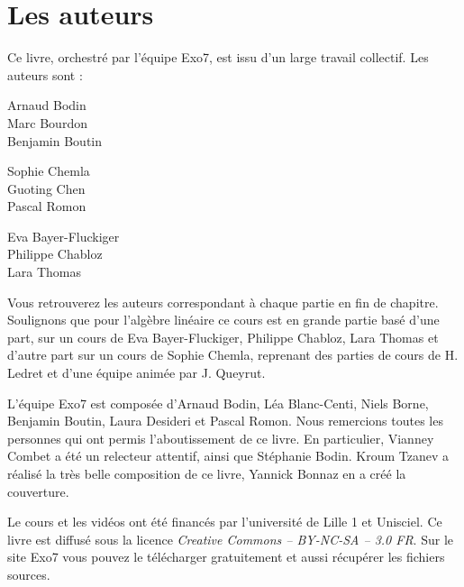 
\clearemptydoublepage
\pagestyle{empty}\thispagestyle{empty}

\vspace*{\fill}

\section*{Les auteurs}

Ce livre, orchestré par l'équipe Exo7, est issu d'un large travail collectif.
Les auteurs sont :

\begin{center}
{
\setlength{\columnseprule}{0pt}
\begin{multicols}{3}
Arnaud Bodin\\
Marc Bourdon\\
Benjamin Boutin


Sophie Chemla\\
Guoting Chen\\
Pascal Romon

Eva Bayer-Fluckiger\\
Philippe Chabloz\\
Lara Thomas
\end{multicols}
}
\end{center}

Vous retrouverez les auteurs correspondant à chaque partie en fin de chapitre.
Soulignons que pour l'algèbre linéaire ce cours est en grande partie basé
d'une part, sur un cours de Eva Bayer-Fluckiger, Philippe Chabloz, Lara Thomas
et d'autre part sur un cours de Sophie Chemla,
reprenant des parties de cours de H. Ledret et d'une équipe animée par J. Queyrut.

\medskip

L'équipe Exo7 est composée d'Arnaud Bodin, Léa Blanc-Centi, Niels Borne, 
Benjamin Boutin, Laura Desideri et Pascal Romon.
Nous remercions toutes les personnes qui ont permis l'aboutissement de ce livre.
En particulier, Vianney Combet a été un relecteur attentif, ainsi que Stéphanie Bodin.
Kroum Tzanev a réalisé la très belle composition de ce livre, Yannick Bonnaz en a créé la couverture.

\medskip

Le cours et les vidéos ont été financés par l'université de Lille 1 et Unisciel.
Ce livre est diffusé sous la licence \emph{Creative Commons -- BY-NC-SA -- 3.0 FR}.
Sur le site Exo7 vous pouvez le télécharger gratuitement et 
aussi récupérer les fichiers sources.
\vspace*{\fill}

